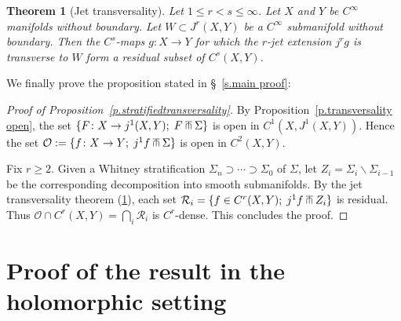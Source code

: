 \documentclass[10pt, a4paper]{amsart}
\theoremstyle{plain}
\newtheorem{otherthm}[lemma]{Theorem}
\theoremstyle{definition}
\theoremstyle{remark}
\theoremstyle{note}
\numberwithin{equation}{section}
\begin{document}
\begin{otherthm}[Jet transversality]\label{t.jtransversality}
Let $1\leq r < s \leq \infty$.
Let $X$ and $Y$ be $C^\infty$ manifolds without boundary.
Let $W\subset J^r(X,Y)$ be a $C^\infty$ submanifold without boundary. 
Then the $C^s$-maps
$g\colon X\to Y$ for which the $r$-jet 
extension $j^r g$ is transverse to $W$
form a residual subset of $C^s(X,Y)$.
\end{otherthm}

We finally prove the proposition stated in \S~\ref{s.main proof}: 

\begin{proof}[Proof of Proposition~\ref{p.stratifiedtransversality}]
By Proposition~\ref{p.transversality open}, the set $\{F\colon X\to j^1(X,Y) ;\; F{\;\;\makebox[0pt]{$\top$}\makebox[0pt]{\small $\cap$}\;\;}{\Sigma}\}$ is open in $C^1\left(X,J^1(X,Y)\right)$. Hence the set ${\mathcal{O}} := \{f\colon X\to Y ;\;j^1f{\;\;\makebox[0pt]{$\top$}\makebox[0pt]{\small $\cap$}\;\;}{\Sigma}\}$ is open in $C^2(X,Y)$. 
	
Fix $r \ge 2$.
Given a Whitney stratification $\Sigma_n \supset \cdots \supset \Sigma_0$ of $\Sigma$,
let $Z_i = \Sigma_i {\smallsetminus} \Sigma_{i-1}$ be the corresponding decomposition into smooth submanifolds. By the jet transversality theorem (\cref{t.jtransversality}),
each set $\mathcal{R}_i = \{f\in C^r(X,Y) ; \; j^1 f {\;\;\makebox[0pt]{$\top$}\makebox[0pt]{\small $\cap$}\;\;} Z_i\}$ is residual. 
Thus ${\mathcal{O}} \cap C^r(X,Y) = \bigcap_i\mathcal{R}_i$ is $C^r$-dense. 
This concludes the proof.
\end{proof}

\section{Proof of the result in the holomorphic setting}\label{a.complex}
\end{document}
